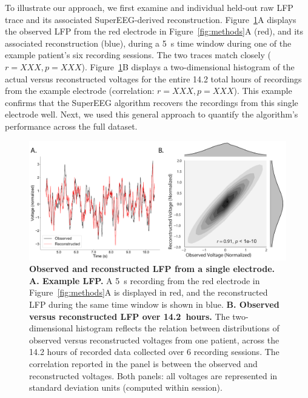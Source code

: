 \documentclass[11pt]{article}
\begin{document}
To illustrate our approach, we first examine and individual held-out
raw LFP trace and its associated SuperEEG-derived reconstruction.
Figure~\ref{fig:recon}A displays the observed LFP from the red
electrode in Figure~\ref{fig:methods}A (red), and its associated
reconstruction (blue), during a 5~s time window during one of the
example patient's six recording sessions.  The two traces match
closely ($r = XXX, p = XXX$).  Figure~\ref{fig:recon}B displays a
two-dimensional histogram of the actual versus reconstructed voltages
for the entire 14.2 total hours of recordings from the example
electrode (correlation: $r = XXX, p = XXX$).  This example confirms
that the SuperEEG algorithm recovers the recordings from this single
electrode well.  Next, we used this general approach to quantify the
algorithm's performance across the full dataset.

\begin{figure}
  \centering
  \includegraphics[width=\textwidth]{figs/recon}
  \caption{\textbf{Observed and reconstructed LFP from a single
      electrode.} \textbf{A. Example LFP.}  A 5~s recording from the
    red electrode in Figure~\ref{fig:methods}A is displayed in red,
    and the reconstructed LFP during the same time window is shown in
    blue.  \textbf{B. Observed versus reconstructed LFP over
      14.2~hours.}  The two-dimensional histogram reflects the
    relation between distributions of observed versus reconstructed
    voltages from one patient, across the 14.2 hours of recorded data
    collected over 6 recording sessions.  The correlation reported in
    the panel is between the observed and reconstructed voltages.
    Both panels: all voltages are represented in standard deviation units
   (computed within session).}
  \label{fig:recon}
\end{figure}
\end{document}

